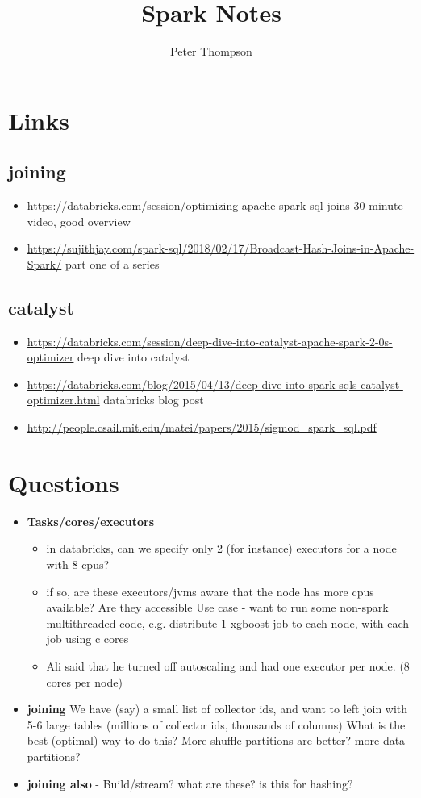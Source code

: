 \documentclass{article}
\title{Spark Notes}
\author{Peter Thompson}
\begin{document}
\section{Links}
\subsection{joining}
    \begin{itemize}
        \item \url{https://databricks.com/session/optimizing-apache-spark-sql-joins} 30 minute video, good overview
        \item \url{https://sujithjay.com/spark-sql/2018/02/17/Broadcast-Hash-Joins-in-Apache-Spark/} part one of a series
    \end{itemize}
\subsection{catalyst}
 \begin{itemize}
        \item \url{https://databricks.com/session/deep-dive-into-catalyst-apache-spark-2-0s-optimizer} deep dive into catalyst
        \item \url{https://databricks.com/blog/2015/04/13/deep-dive-into-spark-sqls-catalyst-optimizer.html} databricks blog post
        \item \url{http://people.csail.mit.edu/matei/papers/2015/sigmod_spark_sql.pdf}
    \end{itemize}

\section{Questions}
\begin{itemize}
    \item {\bf Tasks/cores/executors}
    \begin{itemize}
        \item in databricks, can we specify only 2 (for instance) executors for a node with 8 cpus?
        \item if so, are these executors/jvms aware that the node has more cpus available? Are they accessible
        Use case - want to run some non-spark multithreaded code, e.g. distribute 1 xgboost job to each node, with each job using c cores
        \item Ali said that he turned off autoscaling and had one executor per node. (8 cores per node)
    \end{itemize}
    \item {\bf joining} 
        We have (say) a small list of collector ids, and want to left join with 5-6 large tables (millions of collector ids, thousands of columns)
        What is the best (optimal) way to do this? More shuffle partitions are better? more data partitions?  
    \item {\bf joining also} - Build/stream? what are these? is this for hashing?

\end{itemize}
\end{document}
